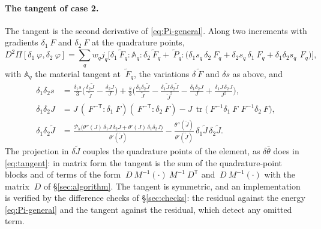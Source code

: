 \documentclass[11pt]{article}
\newcommand{\F}{~F}
\renewcommand{\P}{~P}
\newcommand{\disp}{~\varphi}
\newcommand{\trace}{\operatorname{tr}}
\newcommand{\transpose}[1]{#1^{\mathsf{T}}}
\theoremstyle{definition}
\theoremstyle{plain}
\begin{document}
\paragraph{The tangent of case 2.} The tangent is the second derivative of
\eqref{eq:Pi-general}. Along two increments with gradients $\delta_1\F$ and
$\delta_2\F$ at the quadrature points,
\begin{equation}
  \label{eq:tangent-general}
  D^2\Pi[\delta_1\disp, \delta_2\disp]
  = \sum_q w_q j_q \Big[ \delta_1\tilde{\F}_q : \mathbb{A}_q : \delta_2\tilde{\F}_q
    + \tilde{\P}_q : \big( \delta_1 s_q\, \delta_2\F_q + \delta_2 s_q\, \delta_1\F_q
    + \delta_1\delta_2 s_q\, \F_q \big) \Big] ,
\end{equation}
with $\mathbb{A}_q$ the material tangent at $\tilde{\F}_q$, the variations
$\delta\tilde{\F}$ and $\delta s$ as above, and
\begin{equation}
  \label{eq:d2s}
  \begin{aligned}
  \delta_1\delta_2 s &= \frac{\delta_1 s}{3}\Big(\frac{\delta_2\tilde J}{\tilde J} - \frac{\delta_2 J}{J}\Big)
   + \frac{s}{3}\Big( \frac{\delta_1\delta_2\tilde J}{\tilde J} - \frac{\delta_1\tilde J\,\delta_2\tilde J}{\tilde J^2}
   - \frac{\delta_1\delta_2 J}{J} + \frac{\delta_1 J\,\delta_2 J}{J^2} \Big), \\
  \delta_1\delta_2 J &= J\,(\F^{-\mathsf T} : \delta_1\F)(\F^{-\mathsf T} : \delta_2\F)
   - J\,\trace\big(\F^{-1}\delta_1\F\,\F^{-1}\delta_2\F\big), \\
  \delta_1\delta_2\tilde J &= \frac{\mathcal{P}_h\big(\theta''(J)\,\delta_1 J\,\delta_2 J + \theta'(J)\,\delta_1\delta_2 J\big)}{\theta'(\tilde J)}
   - \frac{\theta''(\tilde J)}{\theta'(\tilde J)}\, \delta_1\tilde J\, \delta_2\tilde J .
  \end{aligned}
\end{equation}
The projection in $\delta\tilde J$ couples the quadrature points of the
element, as $\delta\bar\theta$ does in \eqref{eq:tangent}: in matrix form
the tangent is the sum of the quadrature-point blocks and of terms of the
form $~D ~M^{-1} (\cdot) ~M^{-1} \transpose{~D}$ and $~D ~M^{-1}(\cdot)$
with the matrix $~D$ of \S\ref{sec:algorithm}. The tangent is symmetric,
and an implementation is verified by the difference checks of
\S\ref{sec:checks}: the residual against the energy \eqref{eq:Pi-general}
and the tangent against the residual, which detect any omitted term.
\end{document}

